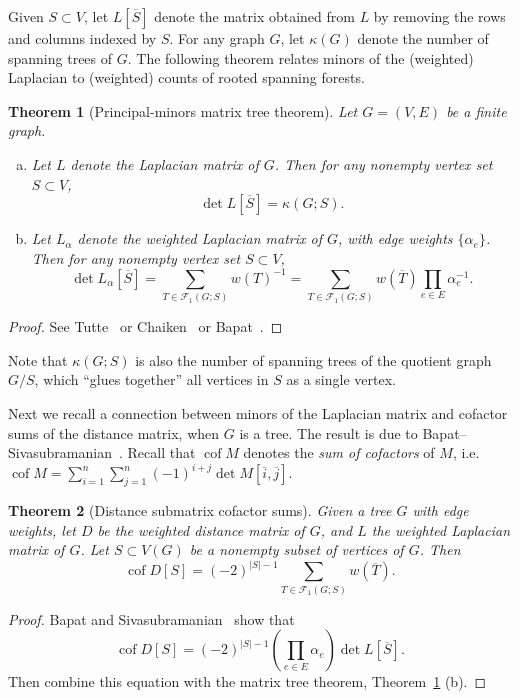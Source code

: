 \documentclass{amsart}
\newtheorem{thm}{Theorem}
\theoremstyle{definition}
\DeclareMathOperator{\cof}{cof}
\newcommand{\trees}{\mathcal{F}_1}
\begin{document}
Given $S \subset V$,
let $L[\overline S]$ denote the matrix obtained from $L$ by removing the rows and columns indexed by $S$.
For any graph $G$, let $\kappa(G)$ denote the number of spanning trees of $G$.
The following theorem relates minors of the (weighted) Laplacian to (weighted) counts of rooted spanning forests.
\begin{thm}[Principal-minors matrix tree theorem]
\label{thm:matrix-tree}
Let $G = (V,E)$ be a finite graph.
\begin{enumerate}[(a)]
\item 
Let $L$ denote the Laplacian matrix of $G$.
Then for any nonempty vertex set $S \subset V$,
\begin{equation}
	\det L[\overline S] = \kappa( G ; S) .
\end{equation}

\item 
Let $L_\alpha$ denote the weighted Laplacian matrix of $G$, with edge weights $\{\alpha_e\}$. 
Then for any nonempty vertex set $S \subset V$,
\begin{equation}
	\det L_\alpha[\overline S] = \sum_{T \in \trees( G ; S)} w(T)^{-1}
	= \sum_{T \in \trees(G; S)} w(\overline{T}) \prod_{e \in E} \alpha_e^{-1} .
\end{equation}
\end{enumerate}
\end{thm}
\begin{proof}
See Tutte~\cite[Section VI.6, Equation (VI.6.7)]{tutte} or Chaiken~\cite{chaiken} or Bapat~\cite[Theorem 4.7]{bapat}.
\end{proof}

Note that $\kappa(G;S)$ is also the number of 
spanning trees of the quotient graph $G / S$, which ``glues together'' all vertices in $S$ as a single vertex.

Next we recall a connection between minors of the Laplacian matrix and cofactor sums of the distance matrix, when $G$ is a tree.
The result is due to Bapat--Sivasubramanian~\cite{bapat-sivasubramanian}.
Recall that $\cof M$ denotes the {\em sum of cofactors} of $M$, i.e. 
$\displaystyle
	\cof M = \sum_{i = 1}^{n} \sum_{j = 1}^{n} (-1)^{i + j} \det M[\overline{i},\overline{j}].
$

\begin{thm}[Distance submatrix cofactor sums]
\label{thm:distance-sub-cof}
Given a tree $G$ with edge weights,
let $D$ be the weighted distance matrix of $G$, and $L$ the weighted Laplacian matrix of $G$.
Let $S \subset V(G)$ be a nonempty subset of vertices of $G$. 
Then
\begin{equation}
	\cof D[S] = (-2)^{|S|-1} \sum_{T \in \trees(G; S)} w(\overline{T}).
\end{equation}
\end{thm}
\begin{proof}
Bapat and Sivasubramanian~\cite[Theorem 11]{bapat-sivasubramanian}
show that
\[
	\cof D[S] = (-2)^{|S|-1} \left( \prod_{e \in E} \alpha_e \right) \det L[\overline S] .
\]
Then combine this equation with the matrix tree theorem,
Theorem~\ref{thm:matrix-tree} (b).
\end{proof}
\end{document}
